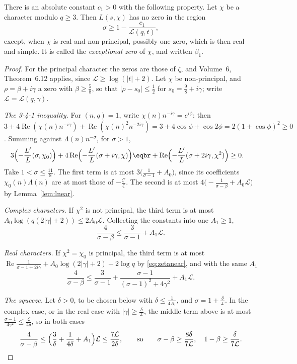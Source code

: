 \begin{theorem}\label{thm:lzerofree}
There is an absolute constant $c_1>0$ with the following property. Let $\chi$ be a character modulo $q\ge3$. Then $L(s,\chi)$ has no zero in the region
\[
\sigma\ge1-\frac{c_1}{\mathcal L(q,t)},
\]
except, when $\chi$ is real and non-principal, possibly one zero, which is then real and simple. It is called the \emph{exceptional zero} of $\chi$, and written $\beta_1$.
\end{theorem}

\begin{proof}
For the principal character the zeros are those of $\zeta$, and Volume~6, Theorem~6.12 applies, since $\mathcal L\ge\log(|t|+2)$. Let $\chi$ be non-principal, and $\rho=\beta+i\gamma$ a zero with $\beta\ge\frac58$, so that $|\rho-s_0|\le\frac12$ for $s_0=\frac98+i\gamma$; write $\mathcal L=\mathcal L(q,\gamma)$.

\emph{The 3-4-1 inequality.} For $(n,q)=1$, write $\chi(n)n^{-i\gamma}=e^{i\phi}$: then $3+4\operatorname{Re}(\chi(n)n^{-i\gamma})+\operatorname{Re}(\chi(n)^2n^{-2i\gamma})=3+4\cos\phi+\cos2\phi=2(1+\cos\phi)^2\ge0$. Summing against $\Lambda(n)n^{-\sigma}$, for $\sigma>1$,
\[
\begin{aligned}3\Bigl(-\frac{L'}L(\sigma,\chi_0)\Bigr)&+4\operatorname{Re}\Bigl(-\frac{L'}L(\sigma+i\gamma,\chi)\Bigr)\eqbr+\operatorname{Re}\Bigl(-\frac{L'}L(\sigma+2i\gamma,\chi^2)\Bigr)\ge0.\end{aligned}
\]
Take $1<\sigma\le\frac{11}8$. The first term is at most $3\bigl(\frac1{\sigma-1}+A_0\bigr)$, since its coefficients $\chi_0(n)\Lambda(n)$ are at most those of $-\frac{\zeta'}\zeta$. The second is at most $4\bigl(-\frac1{\sigma-\beta}+A_0\mathcal L\bigr)$ by Lemma~\ref{lem:lnear}.

\emph{Complex characters.} If $\chi^2$ is not principal, the third term is at most $A_0\log(q(2|\gamma|+2))\le2A_0\mathcal L$. Collecting the constants into one $A_1\ge1$,
\[
\frac4{\sigma-\beta}\le\frac3{\sigma-1}+A_1\mathcal L.
\]

\emph{Real characters.} If $\chi^2=\chi_0$ is principal, the third term is at most $\operatorname{Re}\frac1{\sigma-1+2i\gamma}+A_0\log(2|\gamma|+2)+2\log q$ by \eqref{eq:zetanear}, and with the same $A_1$
\[
\frac4{\sigma-\beta}\le\frac3{\sigma-1}+\frac{\sigma-1}{(\sigma-1)^2+4\gamma^2}+A_1\mathcal L.
\]

\emph{The squeeze.} Let $\delta>0$, to be chosen below with $\delta\le\frac1{4A_1}$, and $\sigma=1+\frac\delta{\mathcal L}$. In the complex case, or in the real case with $|\gamma|\ge\frac\delta{\mathcal L}$, the middle term above is at most $\frac{\sigma-1}{4\gamma^2}\le\frac{\mathcal L}{4\delta}$, so in both cases
\[
\frac4{\sigma-\beta}\le\Bigl(\frac3\delta+\frac1{4\delta}+A_1\Bigr)\mathcal L\le\frac{7\mathcal L}{2\delta},\qquad\text{so}\qquad\sigma-\beta\ge\frac{8\delta}{7\mathcal L},\quad1-\beta\ge\frac\delta{7\mathcal L}.
\]


\end{proof}
